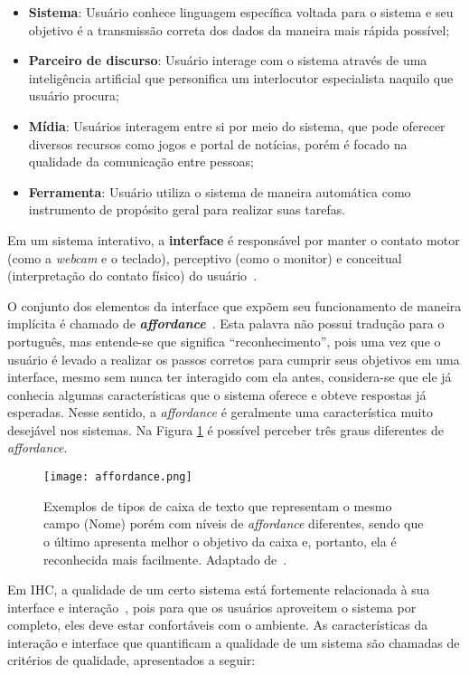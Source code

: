 \begin{itemize}
\item[1] \textbf{Sistema}: Usuário conhece linguagem específica voltada para o sistema e seu objetivo é a transmissão correta dos dados da maneira mais rápida possível;
\item[2] \textbf{Parceiro de discurso}: Usuário interage com o sistema através de uma inteligência artificial que personifica um interlocutor especialista naquilo que usuário procura;
\item[3] \textbf{Mídia}: Usuários interagem entre si por meio do sistema, que pode oferecer diversos recursos como jogos e portal de notícias, porém é focado na qualidade da comunicação entre pessoas;
\item[4] \textbf{Ferramenta}: Usuário utiliza o sistema de maneira automática como instrumento de propósito geral para realizar suas tarefas. 
\end{itemize}

\indent Em um sistema interativo, a \textbf{interface} é responsável por manter o contato motor (como a \textit{webcam} e o teclado), perceptivo (como o monitor) e conceitual (interpretação do contato físico) do usuário~\cite{IHCbook}. 

\indent O conjunto dos elementos da interface que expõem seu funcionamento de maneira implícita é chamado de \textbf{\textit{affordance}}~\cite{IHCbook}. Esta palavra não possui tradução para o português, mas entende-se que significa ``reconhecimento'', pois uma vez que o usuário é levado a realizar os passos corretos para cumprir seus objetivos em uma interface, mesmo sem nunca ter interagido com ela antes, considera-se que ele já conhecia algumas características que o sistema oferece e obteve respostas já esperadas. Nesse sentido, a \textit{affordance} é geralmente uma característica muito desejável nos sistemas. Na Figura \ref{fig:Affordance} é possível perceber três graus diferentes de \textit{affordance}.

\begin{figure}[!h]
    \centering
    \texttt{[image: affordance.png]}
    \caption{Exemplos de tipos de caixa de texto que representam o mesmo campo (Nome) porém com níveis de \textit{affordance} diferentes, sendo que o último apresenta melhor o objetivo da caixa e, portanto, ela é reconhecida mais facilmente. Adaptado de~\cite{affordance}.}
    \label{fig:Affordance}
\end{figure} 

\indent Em IHC, a qualidade de um certo sistema está fortemente relacionada à sua interface e interação~\cite{IHCbook}, pois para que os usuários aproveitem o sistema por completo, eles deve estar confortáveis com o ambiente. As características da interação e interface que quantificam a qualidade de um sistema são chamadas de critérios de qualidade, apresentados a seguir:

